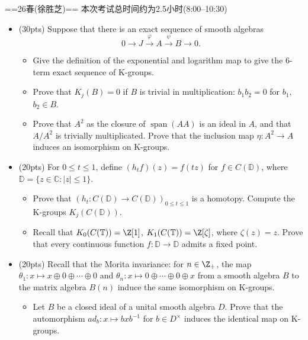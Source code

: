 \newcommand{\C}{\mathbb{C}}
\newcommand{\D}{\mathbb{D}}
\newcommand{\T}{\mathbb{T}}

==26春(徐胜芝)==
本次考试总时间约为2.5小时(8:00--10:30)
\begin{itemize}
    \item[一、](30pts) Suppose that there is an exact sequence of smooth algebras
    \[0\to J\xrightarrow{\varphi}A\xrightarrow{\psi}B\to 0.\]
    \begin{itemize}
        \item[(0)]Give the definition of the exponential and logarithm map to give the $6$-term exact sequence of K-groups.
        \item[(1)]Prove that $K_j(B)=0$ if $B$ is trivial in multiplication: $b_1b_2=0$ for $b_1$, $b_2\in B$.
        \item[(2)]Prove that $A^2$ as the closure of $\operatorname{span}(AA)$ is an ideal in $A$, and that $A/A^2$ is trivially multiplicated.
        Prove that the inclusion map $\eta:A^2\to A$ induces an isomorphism on K-groups.
    \end{itemize}
    \item[二、](20pts) For $0\leqslant t\leqslant 1$, define $(h_tf)(z)=f(tz)$ for $f\in C(\D)$, where $\D=\{z\in\C:|z|\leqslant1\}$.
    \begin{itemize}
        \item[(1)]Prove that $(h_t:C(\D)\to C(\D))_{0\leqslant t\leqslant 1}$ is a homotopy. Compute the K-groups $K_j(C(\D))$.
        \item[(2)]Recall that $K_0(C(\T))=\Z[1]$, $K_1(C(\T))=\Z[\zeta]$, where $\zeta(z)=z$. Prove that every continuous function $f:\D\to\D$ admits a fixed point.
    \end{itemize}
    \item[三、](20pts) Recall that the Morita invariance: for $n\in\Z_+$, the map $\theta_1:x\mapsto x\oplus0\oplus\cdots\oplus0$ and $\theta_n: x\mapsto 0\oplus\cdots\oplus0\oplus x$ from a smooth algebra $B$ to the matrix algebra $B(n)$ induce the same isomorphism on K-groups.
    \begin{itemize}
        \item[(1)]Let $B$ be a closed ideal of a unital smooth algebra $D$. Prove that the automorphism $ad_b:x\mapsto bxb^{-1}$ for $b\in D^{\times}$ induces the identical map on K-groups.

\end{itemize}
\end{itemize}
